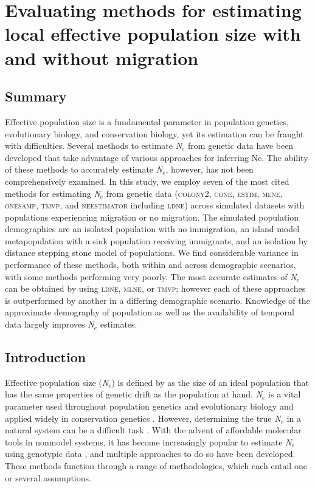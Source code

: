 \chapter{Evaluating methods for estimating local effective population size with and without migration}
\label{chap:effectivepopsize}

\section{Summary}

Effective population size is a fundamental parameter in population genetics, evolutionary 
biology, and conservation biology, yet its estimation can be fraught with difficulties. 
Several methods to estimate \emph{N}$_e$ from genetic data have been developed that take 
advantage of various approaches for inferring Ne. The ability of these methods to accurately 
estimate \emph{N}$_e$, however, has not been comprehensively examined. In this study, we 
employ seven of the most cited methods for estimating \emph{N}$_e$ from genetic data 
(\textsc{colony2}, \textsc{cone}, \textsc{estim}, \textsc{mlne}, \textsc{onesamp}, \textsc{tmvp}, 
and \textsc{neestimator} including \textsc{ldne}) across simulated datasets with populations 
experiencing migration or no migration. The simulated population demographies are an isolated 
population with no immigration, an island model metapopulation with a sink population receiving 
immigrants, and an isolation by distance stepping stone model of populations. We find considerable 
variance in performance of these methods, both within and across demographic scenarios, with 
some methods performing very poorly. The most accurate estimates of \emph{N}$_e$ can be 
obtained by using \textsc{ldne}, \textsc{mlne}, or \textsc{tmvp}; however each of these 
approaches is outperformed by another in a differing demographic scenario. Knowledge of the 
approximate demography of population as well as the availability of temporal data largely 
improves \emph{N}$_e$ estimates.

\section{Introduction}
Effective population size (\emph{N}$_e$) is defined by \citet{Wright:1931} as the size of 
an ideal population that has the same properties of genetic drift as the population at hand. 
\emph{N}$_e$ is a vital parameter used throughout population genetics and evolutionary 
biology and applied widely in conservation genetics \citep{Schwartz:2007, Dudgeon:2012}. 
However, determining the true \emph{N}$_e$ in a natural system can be a difficult task 
\citep{Serbezov:2012, Theunert:2012}. With the advent of affordable molecular tools 
in nonmodel systems, it has become increasingly popular to estimate \emph{N}$_e$ using genotypic 
data \citep{Wang:2005, Palstra:2012}, and multiple approaches to do so have been developed. 
These methods function through a range of methodologies, which each entail one or several assumptions.

